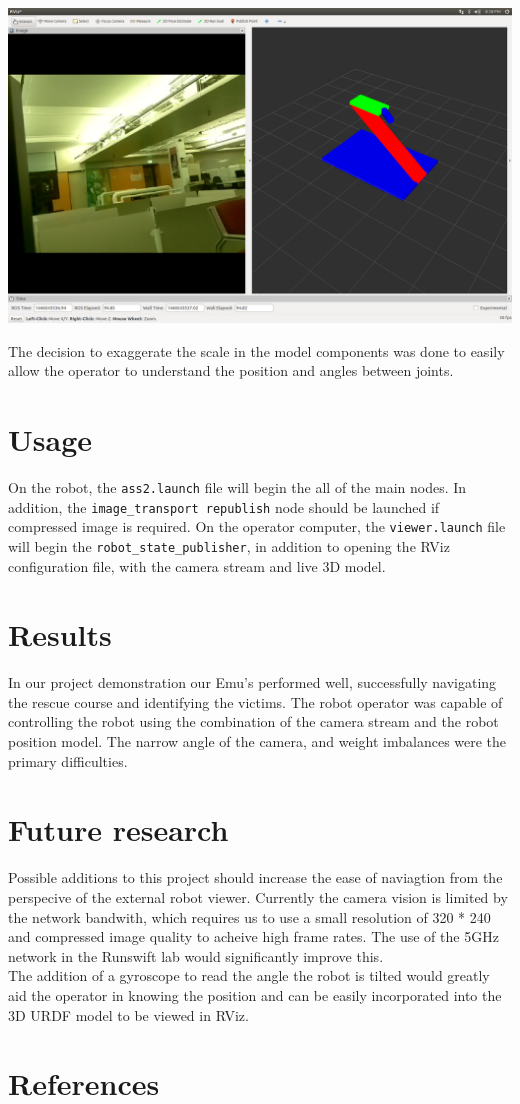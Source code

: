 \documentclass[titlepage,12pt,a4paper]{article}
\begin{document}
\noindent \includegraphics[width=\textwidth]{rviz}

\noindent The decision to exaggerate the scale in the model components was done to easily allow the operator to understand the position and angles between joints.

\section{Usage}
On the robot, the \texttt{ass2.launch} file will begin the all of the main nodes. In addition, the \texttt{image\_transport republish} node should be launched if compressed image is required. On the operator computer, the \texttt{viewer.launch} file will begin the \texttt{robot\_state\_publisher}, in addition to opening the RViz configuration file, with the camera stream and live 3D model.

\section{Results}
In our project demonstration our Emu's performed well, successfully navigating the rescue course and identifying the victims. The robot operator was capable of controlling the robot using the combination of the camera stream and the robot position model. The narrow angle of the camera, and weight imbalances were the primary difficulties.

\section{Future research}
Possible additions to this project should increase the ease of naviagtion from the perspecive of the external robot viewer. Currently the camera vision is limited by the network bandwith, which requires us to use a small resolution of 320 * 240 and compressed image quality to acheive high frame rates. The use of the 5GHz network in the Runswift lab would significantly improve this.\\

\noindent The addition of a gyroscope to read the angle the robot is tilted would greatly aid the operator in knowing the position and can be easily incorporated into the 3D URDF model to be viewed in RViz.


\section{References}
\end{document}
